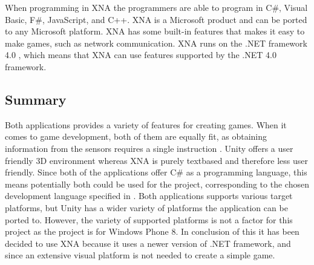 When programming in XNA the programmers are able to program in C\#, Visual Basic, F\#, JavaScript, and C++.
XNA is a Microsoft product and can be ported to any Microsoft platform. 
XNA has some built-in features that makes it easy to make games, such as network communication.
XNA runs on the .NET framework 4.0 \citep{misc:XNAVersion}, which means that XNA can use features supported by the .NET 4.0 framework.

\subsection{Summary}
Both applications provides a variety of features for creating games.
When it comes to game development, both of them are equally fit, as obtaining information from the sensors requires a single instruction \citep{misc:UnitySensor, misc:WindowsPhoneSensor}.
Unity offers a user friendly 3D environment whereas XNA is purely textbased and therefore less user friendly.
Since both of the applications offer C\# as a programming language, this means potentially both could be used for the project, corresponding to the chosen development language specified in .
Both applications supports various target platforms, but Unity has a wider variety of platforms the application can be ported to.
However, the variety of supported platforms is not a factor for this project as the project is for Windows Phone 8.
In conclusion of this it has been decided to use XNA because it uses a newer version of .NET framework, and since an extensive visual platform is not needed to create a simple game.